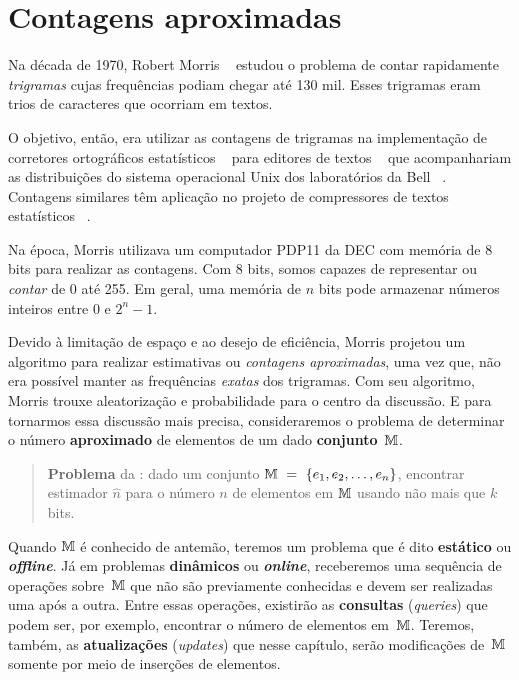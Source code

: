\chapter{Contagens aproximadas}
\label{chap:morris}


Na década de 1970, Robert Morris ~\citep{morris:78} estudou o problema de contar rapidamente \textit{trigramas} cujas 
frequências podiam chegar até 130 mil. Esses trigramas eram trios de caracteres que ocorriam em textos.

O objetivo, então, era utilizar as contagens de trigramas na implementação de corretores ortográficos estatísticos 
~\citep{morris:lorinda:75} para editores de textos ~\citep{mcmahon:cherry:morris:78} que acompanhariam as distribuições 
do sistema operacional Unix dos laboratórios da Bell ~\citep{lumbroso:2018}. Contagens similares têm aplicação no 
projeto de compressores de textos estatísticos ~\citep{text:compression:1990}.

Na época, Morris utilizava um computador PDP11 da DEC com memória de 8 bits para realizar as contagens. Com 8 bits, 
somos capazes de representar ou \textit{contar} de 0 até 255. Em geral, uma memória de $n$ bits pode armazenar números 
inteiros entre 0 e $2^{n} - 1$.

Devido à limitação de espaço e ao desejo de eficiência, Morris projetou um algoritmo para realizar estimativas ou 
\textit{contagens aproximadas}, uma vez que, não era possível manter as frequências \textit{exatas} dos trigramas. Com 
seu algoritmo, Morris trouxe aleatorização e probabilidade para o centro da discussão. E para tornarmos essa discussão 
mais precisa, consideraremos o problema de determinar o número \textbf{aproximado} de elementos de um dado 
\textbf{conjunto}~$\mathbb{M}$. 

\begin{quote}
  \textbf{Problema} da : dado um conjunto $\mathbb{M}~=~\{ e_1, e_2, \dots, e_n \}$, 
  encontrar estimador $\hat{n}$ para o número $n$ de elementos em $\mathbb{M}$ usando não mais que $k$ bits.
\end{quote}

Quando $\mathbb{M}$ é conhecido de antemão, teremos um problema que é dito \textbf{estático} ou \textit{\textbf{offline}}. 
Já em problemas \textbf{dinâmicos} ou \textit{\textbf{online}}, receberemos uma sequência de operações sobre~$\mathbb{M}$ que 
não são previamente conhecidas e devem ser realizadas uma após a outra. Entre essas operações, existirão as 
\textbf{consultas} (\textit{queries}) que podem ser, por exemplo, encontrar o número de elementos em~$\mathbb{M}$. Teremos, 
também, as \textbf{atualizações} (\textit{updates}) que nesse capítulo, serão modificações de~$\mathbb{M}$ somente por meio de 
inserções de elementos.

